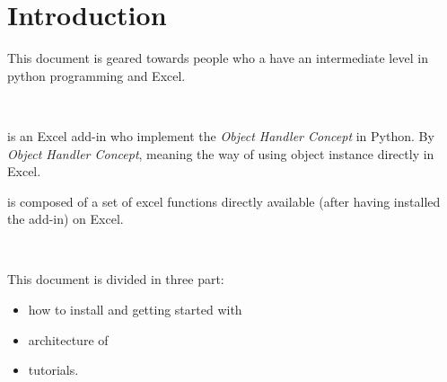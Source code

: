 \chapter{Introduction}

This document is geared towards people who a have an intermediate level in python programming and Excel.

\

\xlp is an Excel add-in who implement the {\it Object Handler Concept} in Python. By {\it Object Handler Concept}, meaning the way of using object instance directly in Excel.

\xlp is composed of a set of excel functions directly available (after having installed the add-in) on Excel.

\

This document is divided in three part: 
\begin{itemize}
\item how to install and getting started with \xlp
\item architecture of \xlp
\item tutorials.
\end{itemize}






